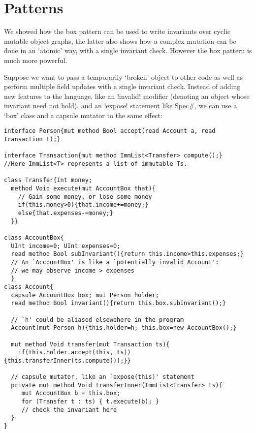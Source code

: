 \section{Patterns}
\label{s:patterns}


We showed how the box pattern can be used to write invariants over cyclic mutable object graphs, the latter also shows how a complex mutation can be done in an `atomic' way, with a single invariant check. However the box pattern is much more powerful.

 Suppose we want to pass a temporarily `broken' object to other code as well as perform multiple field updates with a single invariant check. 
Instead of adding new features to the language, like an \Q!invalid! modifier (denoting an object whose invariant need not hold), and an \Q!expose! statement like Spec\#, we can use a `box' class and a capsule mutator to the same effect:
\begin{lstlisting}
interface Person{mut method Bool accept(read Account a, read Transaction t);}

interface Transaction{mut method ImmList<Transfer> compute();}
//Here ImmList<T> represents a list of immutable Ts.

class Transfer{Int money;
  method Void execute(mut AccountBox that){
    // Gain some money, or lose some money
    if(this.money>0){that.income+=money;}
    else{that.expenses-=money;}
  }}

class AccountBox{
  UInt income=0; UInt expenses=0;
  read method Bool subInvariant(){return this.income>this.expenses;}
  // An `AccountBox' is like a `potentially invalid Account':
  // we may observe income > expenses
  }
class Account{
  capsule AccountBox box; mut Person holder;
  read method Bool invariant(){return this.box.subInvariant();}

  // `h' could be aliased elsewehere in the program    
  Account(mut Person h){this.holder=h; this.box=new AccountBox();}

  mut method Void transfer(mut Transaction ts){
    if(this.holder.accept(this, ts)){this.transferInner(ts.compute());}}

  // capsule mutator, like an `expose(this)' statement
  private mut method Void transferInner(ImmList<Transfer> ts){
     mut AccountBox b = this.box;
     for (Transfer t : ts) { t.execute(b); }
     // check the invariant here
  }
}
\end{lstlisting}
